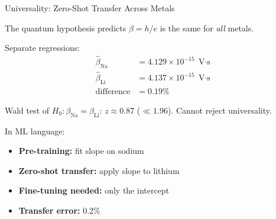 \documentclass[aspectratio=169]{beamer}
\begin{document}
\begin{frame}{Universality: Zero-Shot Transfer Across Metals}

The quantum hypothesis predicts $\beta = h/e$ is the same for
\emph{all} metals. %

\medskip
Separate regressions:
\begin{align*}
  \hat\beta_{\mathrm{Na}} &= 4.129\times10^{-15}\;\text{V$\cdot$s} \\
  \hat\beta_{\mathrm{Li}} &= 4.137\times10^{-15}\;\text{V$\cdot$s} \\
  \text{difference} &= 0.19\%
\end{align*}

Wald test of $H_0\colon \beta_{\mathrm{Na}} = \beta_{\mathrm{Li}}$:\quad
$z \approx 0.87$ ($\ll 1.96$). Cannot reject universality.

\medskip
In ML language:
\begin{itemize}
  \item \textbf{Pre-training:} fit slope on sodium
  \item \textbf{Zero-shot transfer:} apply slope to lithium
  \item \textbf{Fine-tuning needed:} only the intercept %
  \item \textbf{Transfer error:} 0.2\%
\end{itemize}

\end{frame}
\end{document}
